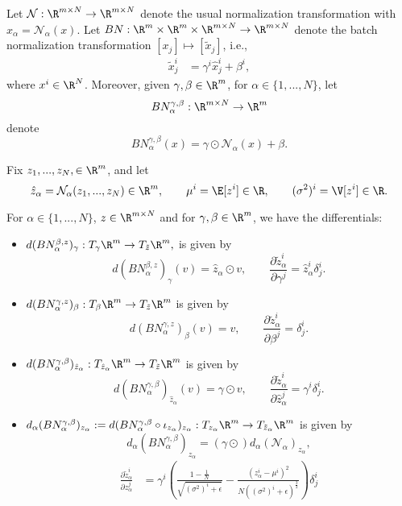 \begin{prop}
	Let $\mathcal{N}:\R^{m\times N}\to\R^{m\times N}$ denote the usual normalization transformation with $\hat{x}_\alpha=\mathcal{N}_\alpha(x)$.
	Let $BN:\R^m\times\R^m\times\R^{m\times N}\to\R^{m\times N}$ denote the batch normalization transformation $[x_j]\mapsto[\tilde{x}_j]$, i.e.,
	\begin{align*}
		\tilde{x}^i_j&=\gamma^i\hat{x}^i_j+\beta^i,
	\end{align*}
	where $x^i\in\R^N$.  Moreover, given $\gamma,\beta\in\R^m$, for $\alpha\in\{1,...,N\}$, let
	$$BN^{\gamma,\beta}_\alpha:\R^{m\times N}\to\R^m$$
	denote
	$$BN^{\gamma,\beta}_\alpha(x)=\gamma\odot\mathcal{N}_\alpha(x)+\beta.$$
	
	
	Fix $z_1,...,z_N,\in\R^m$, and let
	$$\hat{z}_\alpha=\mathcal{N}_\alpha(z_1,...,z_N)\in\R^m,\qquad \mu^i=\E[z^i]\in\R,\qquad(\sigma^2)^i=\V[z^i]\in\R.$$
	
	For $\alpha\in\{1,...,N\}$, $z\in\R^{m\times N}$ and for $\gamma,\beta\in\R^m$, we have the differentials:
	\begin{itemize}	
		\item $d(BN_\alpha^{\beta,z})_\gamma:T_\gamma\R^m\to T_{\tilde{z}}\R^m,$ is given by
		$$d(BN_\alpha^{\beta,z})_\gamma(v)=\hat{z}_\alpha\odot v,\qquad\frac{\partial\tilde{z}_\alpha^i}{\partial\gamma^j}=\hat{z}_\alpha^i\delta^i_j.$$
		\item $d(BN_\alpha^{\gamma,z})_\beta:T_\beta\R^m\to T_{\tilde{z}}\R^m$ is given by
		$$d(BN_\alpha^{\gamma,z})_\beta(v)=v,\qquad\frac{\partial\tilde{z}_\alpha^i}{\partial \beta^j}=\delta^i_j.$$
		\item $d(BN_\alpha^{\gamma,\beta})_{\hat{z}_\alpha}:T_{\hat{z}_\alpha}\R^m\to T_{\tilde{z}}\R^m$ is given by
		$$d(BN_\alpha^{\gamma,\beta})_{\hat{z}_\alpha}(v)=\gamma\odot v,\qquad\frac{\partial\tilde{z}_\alpha^i}{\partial\hat{z}_\alpha^j}=\gamma^i\delta^i_j.$$
		\item $d_\alpha(BN_\alpha^{\gamma,\beta})_{z_\alpha}:=d(BN_\alpha^{\gamma,\beta}\circ\iota_{z_\alpha})_{z_\alpha}:T_{z_\alpha}\R^m\to T_{\tilde{z}_\alpha}\R^m$ is given by
		$$d_\alpha(BN_\alpha^{\gamma,\beta})_{z_\alpha}=(\gamma\odot)d_\alpha(\mathcal{N}_\alpha)_{z_\alpha},$$
		\begin{align*}
			\frac{\partial\tilde{z}^i_\alpha}{\partial z^j_\alpha}&=\gamma^i\left(\frac{1-\frac{1}{N}}{\sqrt{(\sigma^2)^i+\epsilon}}-\frac{(z_\alpha^i-\mu^i)^2}{N((\sigma^2)^i+\epsilon)^{\frac{3}{2}}}\right)\delta^i_j
		\end{align*}
	\end{itemize}
\end{prop}

